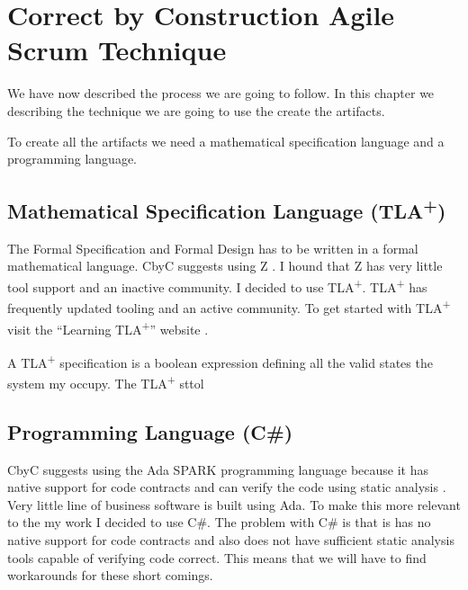 
\chapter{Correct by Construction Agile Scrum Technique} %

\label{Chapter_Applying_the_methodology} %

We have now described the process we are going to follow. In this chapter we
describing the technique we are going to use the create the artifacts.

To create all the artifacts we need a mathematical specification language
and a programming language.

\section{Mathematical Specification Language (TLA\textsuperscript{+})}

The Formal Specification and Formal Design has to be written in a formal
mathematical language. CbyC suggests using Z  \parencite{CbyCPraxis}. 
I hound that Z has very little tool support and an inactive community. I decided
to use TLA\textsuperscript{+}.  TLA\textsuperscript{+} has frequently updated 
tooling and an active community. To get started with TLA\textsuperscript{+}
visit the ``Learning TLA\textsuperscript{+}'' website \parencite{LearningTLA}.

 A TLA\textsuperscript{+} specification is a boolean expression defining all the valid 
states the system my occupy. The TLA\textsuperscript{+} sttol

\section{Programming Language (C\#)}

CbyC suggests using the Ada SPARK programming language because it has native
support for code contracts and can verify the code using static analysis \parencite{CbyCPraxis}.
Very little line of business software is built using Ada. To make this more relevant 
to the my work I decided to use C\#. The problem with C\# is that is has no native
support for code contracts and also does not have sufficient static analysis tools 
capable of verifying code correct. This means that we will have to find workarounds
for these short comings. 

